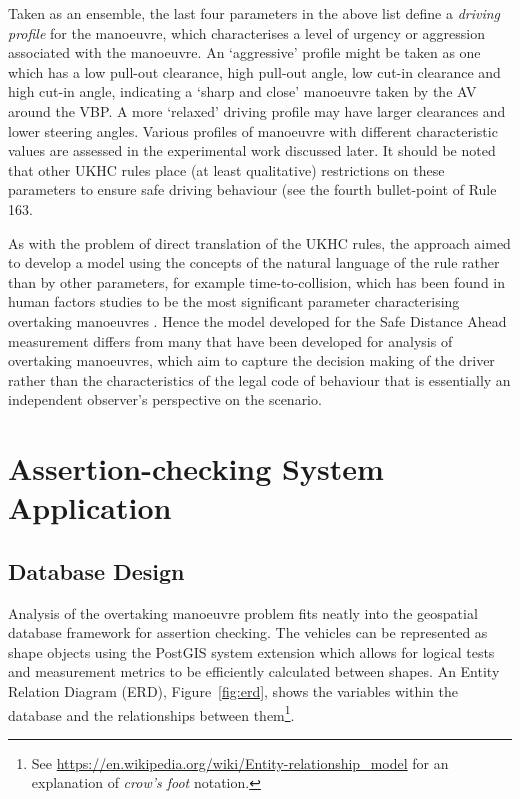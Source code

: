 Taken as an ensemble, the last four parameters in the above list define a \emph{driving profile} for the manoeuvre, which characterises a level of urgency or aggression associated with the manoeuvre. An `aggressive' profile might be taken as one which has a low pull-out clearance, high pull-out angle, low cut-in clearance and high cut-in angle, indicating a `sharp and close' manoeuvre taken by the AV around the VBP. A more `relaxed' driving profile may have larger clearances and lower steering angles. Various profiles of manoeuvre with different characteristic values are assessed in the experimental work discussed later. It should be noted that other UKHC rules place (at least qualitative) restrictions on these parameters to ensure safe driving behaviour (see the fourth bullet-point of Rule 163.%

As with the problem of direct translation of the UKHC rules, the approach aimed to develop a model using the concepts of the natural language of the rule rather than by other parameters, for example time-to-collision, which has been found in human factors studies to be the most significant parameter characterising overtaking manoeuvres \cite{lenard2018, Chen2015}. Hence the model developed for the Safe Distance Ahead measurement differs from many that have been developed for analysis of overtaking manoeuvres, which aim to capture the decision making of the driver rather than the characteristics of the legal code of behaviour that is essentially an independent observer's perspective on the scenario.

\section{Assertion-checking System Application}

\subsection{Database Design}

Analysis of the overtaking manoeuvre problem fits neatly into the geospatial database framework for assertion checking. The vehicles can be represented as shape objects using the PostGIS system extension which allows for logical tests and measurement metrics to be efficiently calculated between shapes. An Entity Relation Diagram (ERD), Figure~\ref{fig:erd}, shows the variables within the database and the relationships between them\footnote{See \url{https://en.wikipedia.org/wiki/Entity-relationship\_model} for an explanation of \textit{crow's foot} notation.}. 

